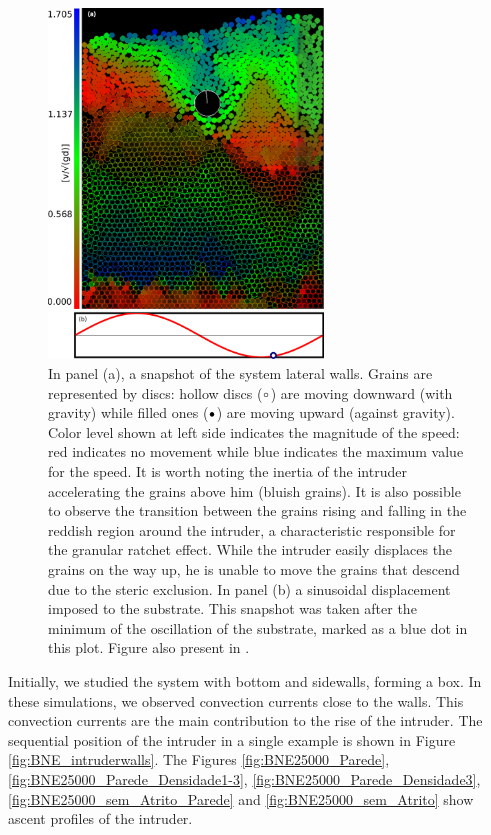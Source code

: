 \begin{figure}
    \centering
    \includegraphics[width=0.65\textwidth]{04-figuras/BNE.pdf}
    \caption[BNE snapshot.]{In panel (a), a snapshot of the system lateral walls. Grains are represented by discs: hollow discs ($\textcolor{black}{\circ}$) are moving downward (with gravity) while filled ones ($\textcolor{black}{\bullet}$) are moving upward (against gravity). Color level shown at left side indicates the magnitude of the speed: red indicates no movement while blue indicates the maximum value for the speed. It is worth noting the inertia of the intruder accelerating the grains above him (bluish grains). It is also possible to observe the transition between the grains rising and falling in the reddish region around the intruder, a characteristic responsible for the granular ratchet effect. While the intruder easily displaces the grains on the way up, he is unable to move the grains that descend due to the steric exclusion. In panel (b) a sinusoidal displacement imposed to the substrate. This snapshot was taken after the minimum of the oscillation of the substrate, marked as a blue dot in this plot. Figure also present in \cite{Large-deviation_quantification_of_boundary_conditions_on_the_Brazil_nut_effect}.}
    \label{fig:BNE}
\end{figure}

    Initially, we studied the system with bottom and sidewalls, forming a box. In these simulations, we observed convection currents close to the walls. This convection currents are the main contribution to the rise of the intruder. The sequential position of the intruder in a single example is shown in Figure \ref{fig:BNE_intruderwalls}. The Figures \ref{fig:BNE25000_Parede}, \ref{fig:BNE25000_Parede_Densidade1-3}, \ref{fig:BNE25000_Parede_Densidade3}, \ref{fig:BNE25000_sem_Atrito_Parede} and \ref{fig:BNE25000_sem_Atrito} show ascent profiles of the intruder.


